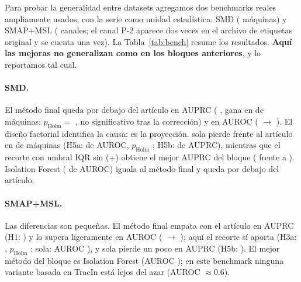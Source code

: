 Para probar la generalidad entre datasets agregamos dos benchmarks reales ampliamente usados, con la serie
como unidad estadística: SMD ( máquinas) y SMAP+MSL ( canales; el canal P-2 aparece dos
veces en el archivo de etiquetas original y se cuenta una vez). La Tabla~\ref{tab:bench} resume los
resultados. \textbf{Aquí las mejoras no generalizan como en los bloques anteriores}, y lo reportamos tal cual.

\paragraph{SMD.} El método final queda por debajo del artículo en AUPRC (
, gana en  de  máquinas; $p_{\text{Holm}}=$ ,
no significativo tras la corrección) y en AUROC ( $\to$ ). El diseño
factorial identifica la causa: es la proyección. \MIII{} sola pierde frente al artículo en
 de  máquinas (H5a:  de AUROC, $p_{\text{Holm}}$
; H5b:  de AUPRC), mientras que el recorte con umbral IQR sin \MIII{}
(\MI+\MII{}) obtiene el mejor AUPRC del bloque ( frente a ).
Isolation Forest ( de AUROC) iguala al método final y queda por debajo del artículo.

\paragraph{SMAP+MSL.} Las diferencias son pequeñas. El método final empata con el artículo en AUPRC
(H1:  ) y lo supera ligeramente en AUROC ( $\to$
); aquí el recorte sí aporta (H3a: , $p_{\text{Holm}}$
; \MII{} sola: AUROC ), y \MIII{} sola pierde un poco en AUPRC
(H5b: ). El mejor método del bloque es Isolation Forest (AUROC ); en
este benchmark ninguna variante basada en TracIn está lejos del azar (AUROC $\approx 0.6$).

